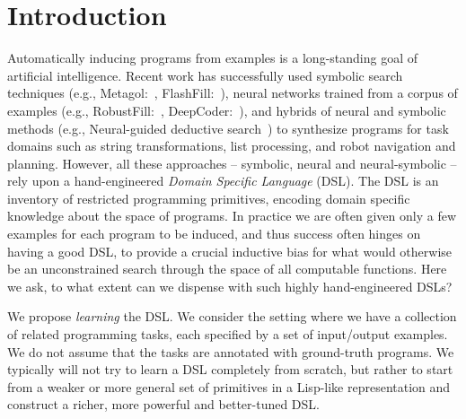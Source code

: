 \documentclass{article}
\newcommand{\system}{\textsc{DreamCoder}~}
\begin{document}
\printAffiliationsAndNotice{\icmlEqualContribution} %

\begin{abstract}
  Successful approaches to program induction require a
  hand-engineered domain-specific language (DSL),
  constraining the space of allowed programs and imparting
  prior knowledge of the domain.
  We contribute a program learning algorithm
  called \system
  that infers a DSL
  and trains a neural network to
  efficiently search for programs in the learned DSL.
  We use our model to build circuits,
  edit strings, do symbolic regression,
  and synthesize functions on lists,
  in each case showing that
  \system learns a domain-specific vocabulary for expressing programs.
  
  
  
  
  

\end{abstract}

\section{Introduction}

Automatically inducing programs from examples is a long-standing goal
of artificial intelligence. Recent work has successfully used
symbolic search techniques (e.g., Metagol:~\cite{muggleton2015meta},
FlashFill:~\cite{gulwani2011automating}), neural networks trained from
a corpus of examples (e.g., RobustFill:~\cite{devlin2017robustfill},
DeepCoder:~\cite{balog2016deepcoder}), and hybrids of neural and
symbolic methods (e.g., Neural-guided deductive search~\cite{ngds}) to
synthesize programs for task domains such as string transformations,
list processing, and robot navigation and planning. However, all these
approaches -- symbolic, neural and neural-symbolic -- rely upon a
hand-engineered \emph{Domain Specific Language} (DSL). The DSL is an
inventory of restricted programming primitives, encoding domain
specific knowledge about the space of programs. In
practice
we are often given only a few examples for each
program to be induced, and thus success often hinges on having a good
DSL, to
provide a crucial inductive bias for what would otherwise be an
unconstrained search through the space of all computable functions.
Here we ask, to what extent can we dispense with such highly
hand-engineered DSLs?

We propose \emph{learning} the DSL. We consider the setting where we
have a collection of related programming tasks, each specified by a
set of input/output examples. We do not assume that the tasks are
annotated with ground-truth programs. We typically will not try to
learn a DSL completely from scratch, but rather to start from a weaker
or more general set of primitives in a Lisp-like representation and
construct a richer, more powerful and better-tuned DSL.
\end{document}
